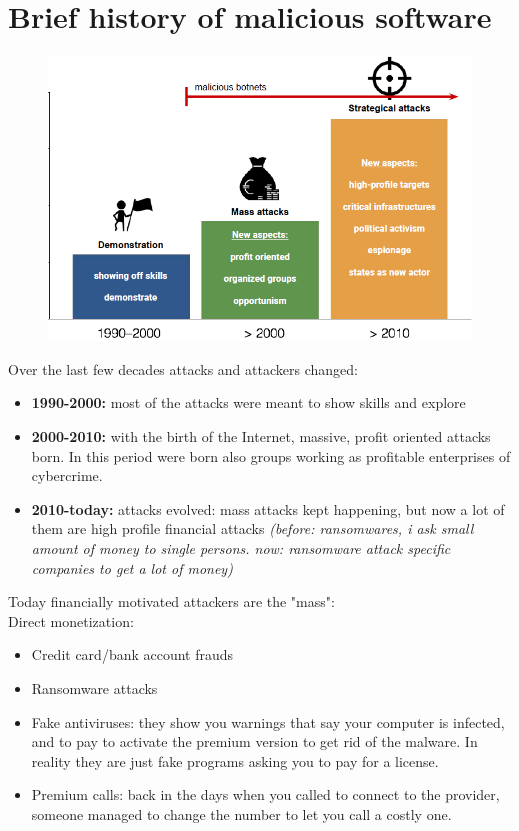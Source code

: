     \section{Brief history of malicious software}
        \begin{figure}[ht!]
            \centering
            \includegraphics[width=0.7\linewidth]{malicious.png}
        \end{figure}
        Over the last few decades attacks and attackers changed:
        \begin{itemize}
            \item \textbf{1990-2000:} most of the attacks were meant to show skills and explore
            \item \textbf{2000-2010:} with the birth of the Internet, massive, profit oriented attacks born. In this period were born also groups working as profitable enterprises of cybercrime.
            \item \textbf{2010-today:} attacks evolved: mass attacks kept happening, but now a lot of them are high profile financial attacks \textit{(before: ransomwares, i ask small amount of money to single persons. now: ransomware attack specific companies to get a lot of money)} 
        \end{itemize}
        Today financially motivated attackers are the "mass":\\
        Direct monetization:
        \begin{itemize}
            \item Credit card/bank account frauds
            \item Ransomware attacks 
            \item Fake antiviruses: they show you warnings that say your computer is infected, and to pay to activate the premium version to get rid of the malware. In reality they are just fake programs asking you to pay for a license.
            \item Premium calls: back in the days when you called to connect to the provider, someone managed to change the number to let you call a costly one.
        \end{itemize} 
\newpage
